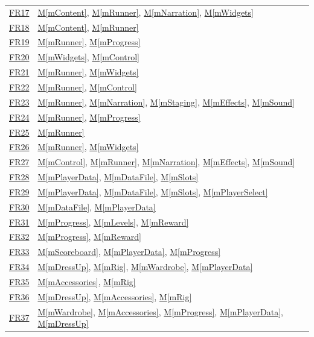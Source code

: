 \documentclass[10pt, titlepage]{article}
\newcommand{\srsurl}{https://team-hindsight.github.io/ophthamology-game/SRS/SRS.pdf}
\newcommand{\srsitemref}[2]{\href{\srsurl\#nameddest=#1}{#2}}
\newcommand{\mref}[1]{\texorpdfstring{\hyperref[md:#1]{M\ref*{#1}}}{M\ref*{#1}}}
\begin{document}
\begin{longtable}{@{}p{}p{}@{}}
\srsitemref{FR_RevealAnswer}{FR17} & \mref{mContent}, \mref{mRunner}, \mref{mNarration}, \mref{mWidgets} \\
\srsitemref{FR_ValidQuestions}{FR18} & \mref{mContent}, \mref{mRunner} \\
\srsitemref{FR_NoPenalty}{FR19} & \mref{mRunner}, \mref{mProgress} \\
\srsitemref{FR_IgnoreRepeatedTouches}{FR20} & \mref{mWidgets}, \mref{mControl} \\
\srsitemref{FR_HoldSkip}{FR21} & \mref{mRunner}, \mref{mWidgets} \\
\srsitemref{FR_ExitLevel}{FR22} & \mref{mRunner}, \mref{mControl} \\
\srsitemref{FR_StopOnExit}{FR23} & \mref{mRunner}, \mref{mNarration}, \mref{mStaging}, \mref{mEffects}, \mref{mSound} \\
\srsitemref{FR_ExitKeepsData}{FR24} & \mref{mRunner}, \mref{mProgress} \\
\srsitemref{FR_RestartAfterExit}{FR25} & \mref{mRunner} \\
\srsitemref{FR_RestartLevel}{FR26} & \mref{mRunner}, \mref{mWidgets} \\
\srsitemref{FR_Suspend}{FR27} & \mref{mControl}, \mref{mRunner}, \mref{mNarration}, \mref{mEffects}, \mref{mSound} \\
\srsitemref{FR_PersistState}{FR28} & \mref{mPlayerData}, \mref{mDataFile}, \mref{mSlots} \\
\srsitemref{FR_RestoreState}{FR29} & \mref{mPlayerData}, \mref{mDataFile}, \mref{mSlots}, \mref{mPlayerSelect} \\
\srsitemref{FR_CorruptData}{FR30} & \mref{mDataFile}, \mref{mPlayerData} \\
\srsitemref{FR_FirstReward}{FR31} & \mref{mProgress}, \mref{mLevels}, \mref{mReward} \\
\srsitemref{FR_NoDuplicateReward}{FR32} & \mref{mProgress}, \mref{mReward} \\
\srsitemref{FR_Scoreboard}{FR33} & \mref{mScoreboard}, \mref{mPlayerData}, \mref{mProgress} \\
\srsitemref{FR_ChooseCharacter}{FR34} & \mref{mDressUp}, \mref{mRig}, \mref{mWardrobe}, \mref{mPlayerData} \\
\srsitemref{FR_DiverseCharacters}{FR35} & \mref{mAccessories}, \mref{mRig} \\
\srsitemref{FR_Shop}{FR36} & \mref{mDressUp}, \mref{mAccessories}, \mref{mRig} \\
\srsitemref{FR_Purchase}{FR37} & \mref{mWardrobe}, \mref{mAccessories}, \mref{mProgress}, \mref{mPlayerData}, \mref{mDressUp} \\

\end{longtable}
\end{document}
